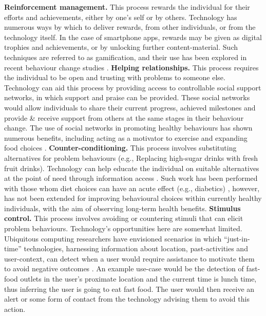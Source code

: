 \textbf{Reinforcement management.} This process rewards the individual for their efforts and achievements, either by one's self or by others. Technology has numerous ways by which to deliver rewards, from other individuals, or from the technology itself. In the case of smartphone apps, rewards may be given as digital trophies and achievements, or by unlocking further content-material. Such techniques are referred to as gamification, and their use has been explored in recent behaviour change studies \cite{Schoech2013}.
\newline \textbf{Helping relationships.} This process requires the individual to be open and trusting with problems to someone else. Technology can aid this process by providing access to controllable social support networks, in which support and praise can be provided. These social networks would allow individuals to share their current progress, achieved milestones and provide \& receive support from others at the same stages in their behaviour change. The use of social networks in promoting healthy behaviours has shown numerous benefits, including acting as a motivator to exercise and expanding food choices \cite{Vaterlaus2015, Kamal2014}.
\newline \textbf{Counter-conditioning.} This process involves substituting alternatives for problem behaviours (e.g., Replacing high-sugar drinks with fresh fruit drinks). Technology can help educate the individual on suitable alternatives at the point of need through information access \cite{Kamal2014, Hermawati2014, Dunford2014}. Such work has been performed with those whom diet choices can have an acute effect (e.g., diabetics) \cite{Klonoff2013}, however, has not been extended for improving behavioural choices within currently healthy individuals, with the aim of observing long-term health benefits.
\newline \textbf{Stimulus control.} This process involves avoiding or countering stimuli that can elicit problem behaviours. Technology's opportunities here are somewhat limited. Ubiquitous computing researchers have envisioned scenarios in which ``just-in-time'' technologies, harnessing information about location, past-activities and user-context, can detect when a user would require assistance to motivate them to avoid negative outcomes \cite{Intille2004}. An example use-case would be the detection of fast-food outlets in the user's proximate location and the current time is lunch time, thus inferring the user is going to eat fast food. The user would then receive an alert or some form of contact from the technology advising them to avoid this action.


